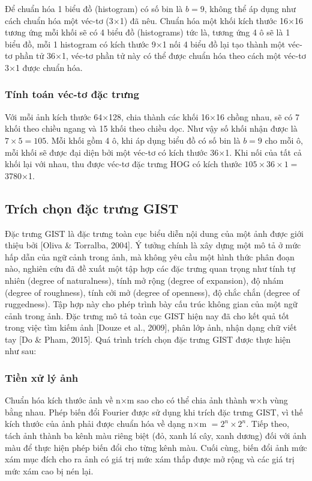 Để chuẩn hóa 1 biểu đồ (histogram) có số bin là $b = 9$, không thể áp dụng như cách chuẩn hóa một véc-tơ (3$\times$1) đã nêu.  Chuẩn hóa một khối kích thước 16$\times$16 tương ứng mỗi khối sẽ có 4 biểu đồ (histograms) tức là, tương ứng 4 ô sẽ là 1 biểu đồ, mỗi 1 histogram có kích thước 9$\times$1 nối 4 biểu đồ lại tạo thành một véc-tơ phần tử 36$\times$1, véc-tơ phần tử này có thể được chuẩn hóa theo cách một véc-tơ 3$\times$1 được chuẩn hóa.

\subsubsection{Tính toán véc-tơ đặc trưng}
Với mỗi ảnh kích thước 64$\times$128, chia thành các khối 16$\times$16 chồng nhau, sẽ có 7 khối theo chiều ngang và 15 khối theo chiều dọc. Như vậy số khối nhận được là $7 \times 5=105$. Mỗi khối gồm 4 ô, khi áp dụng biểu đồ có số bin là $b=9$ cho mỗi ô, mỗi khối sẽ được đại diện bởi một véc-tơ có kích thước 36$\times$1. Khi nối của tất cả khối lại với nhau, thu được véc-tơ đặc trưng HOG có kích thước $105 \times 36 \times 1 =$ 3780$\times$1.


\subsection{Trích chọn đặc trưng GIST}
Đặc trưng GIST là đặc trưng toàn cục biểu diễn nội dung của một ảnh được giới thiệu bởi [Oliva \& Torralba, 2004]. Ý tưởng chính là xây dựng một mô tả ở mức hấp dẫn của ngữ cảnh trong ảnh, mà không yêu cầu một hình thức phân đoạn nào, nghiên cứu đã đề xuất một tập hợp các đặc trưng quan trọng như tính tự nhiên (degree of naturalness), tính mở rộng (degree of expansion), độ nhám (degree of roughness), tính cởi mở (degree of openness), độ chắc chắn (degree of ruggedness). Tập hợp này cho phép trình bày cấu trúc không gian của một ngữ cảnh trong ảnh. Đặc trưng mô tả toàn cục GIST hiện nay đã cho kết quả tốt trong việc tìm kiếm ảnh [Douze et al., 2009], phân lớp ảnh, nhận dạng chữ viết tay [Do \& Pham, 2015]. Quá trình trích chọn đặc trưng GIST được thực hiện như sau:\par

\subsubsection{Tiền xử lý ảnh}
Chuẩn hóa kích thước ảnh về n$\times$m sao cho có thể chia ảnh thành w$\times$h vùng bằng nhau. Phép biến đổi Fourier được sử dụng khi trích đặc trưng GIST, vì thế kích thước của ảnh phải được chuẩn hóa về dạng n$\times$m $=2^n \times 2^n$. Tiếp theo, tách ảnh thành ba kênh màu riêng biệt (đỏ, xanh lá cây, xanh dương) đối với ảnh màu để thực hiện phép biến đổi cho từng kênh màu. Cuối cùng, biến đổi ảnh mức xám mục đích cho ra ảnh có giá trị mức xám thấp được mở rộng và các giá trị mức xám cao bị nén lại.

